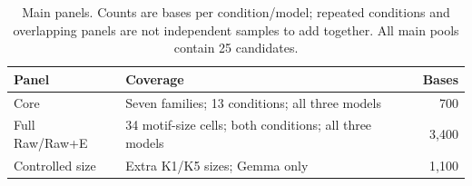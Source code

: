 \begin{table}[t]
\caption{Main panels. Counts are bases per condition/model; repeated conditions and overlapping panels are not independent samples to add together. All main pools contain 25 candidates.}
\label{tab:design}
\centering
\begin{tabular}{p{}p{}r}
\toprule
Panel & Coverage & Bases \\
\midrule
Core & Seven families; 13 conditions; all three models & 700 \\
Full Raw/Raw+E & 34 motif-size cells; both conditions; all three models & 3,400 \\
Controlled size & Extra K1/K5 sizes; Gemma only & 1,100 \\
\bottomrule
\end{tabular}
\end{table}
